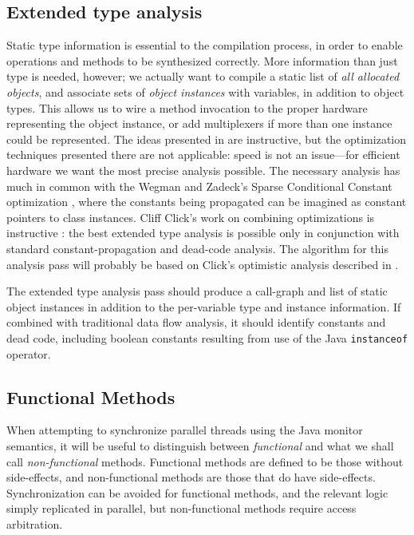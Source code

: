 \documentclass[11pt,notitlepage,twocolumn]{article}
\begin{document}
\subsection{Extended type analysis}
\label{sec:ext_type_analysis}
Static type information is essential to the compilation process, in
order to enable operations and methods to be synthesized correctly.
More information than just type is needed, however; we actually want
to compile a static list of \textit{all allocated objects}, and
associate sets of \textit{object instances} with variables, in
addition to object types.  This allows us to wire a method invocation
to the proper hardware representing the object instance, or add
multiplexers if more than one instance could be represented.  The
ideas presented in \cite{defouw98:classanal} are instructive, but the
optimization techniques presented there are not applicable: speed is
not an issue---for efficient hardware we want the most precise
analysis possible.  The necessary analysis has much in common with
the Wegman and Zadeck's Sparse Conditional Constant optimization
\cite{wegman91:scc}, where the constants being propagated can be
imagined as constant pointers to class instances.  Cliff Click's work
on combining optimizations is instructive \cite{click95:combin}: the
best extended type analysis is possible only in conjunction with
standard constant-propagation and dead-code analysis.  The algorithm
for this analysis pass will probably be based on Click's
optimistic analysis described in \cite{click95:thesis}.

The extended type analysis pass should produce a call-graph and
list of static object instances in addition to the per-variable type
and instance information.  If combined with traditional data flow
analysis, it should identify constants and dead code, including
boolean constants resulting from use of the Java \texttt{instanceof}
operator.

\subsection{Functional Methods}
When attempting to synchronize parallel threads using the Java monitor
semantics, it will be useful to distinguish between
\textit{functional} and what we shall call \textit{non-functional}
methods.  Functional methods are defined to be those without
side-effects, and non-functional methods are those that do have
side-effects.  Synchronization can be avoided for functional methods,
and the relevant logic simply replicated in parallel, but
non-functional methods require access arbitration.
\end{document}

